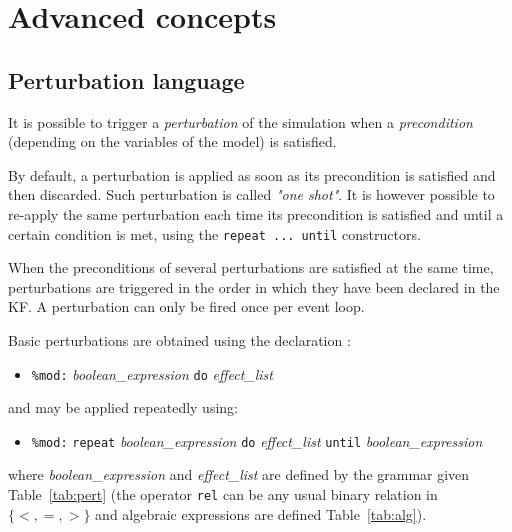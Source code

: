 \documentclass[11pt]{book}
\def\ttt#1{\texttt{#1}}
\def\set#1{\{#1\}}
\def\ITE#1{\begin{itemize}#1\end{itemize}}
\begin{document}
\chapter{Advanced concepts}\label{chap:advanced}

\section{Perturbation language}\label{sec:mod}

It is possible to trigger a \emph{perturbation} of
the simulation when a \textit{precondition} (depending on the
variables of the model) is satisfied.

By default, a perturbation is applied as soon as its precondition is
satisfied and then discarded. Such perturbation is called \emph{"one
  shot"}. It is however possible to
re-apply the same perturbation each time its precondition is
satisfied and until a certain condition is met, using the \ttt{repeat
  ... until} constructors.

When the preconditions of several perturbations are satisfied at the
same time, perturbations are triggered in the order in which they have
been declared in the KF. A perturbation can only be
fired once per event loop.

Basic perturbations are obtained using the declaration :
\ITE{
\item[] \ttt{\%mod:} \textit{boolean\_expression} \ttt{do} \textit{effect\_list}
}
and may be applied repeatedly using:
\ITE{
\item[] \ttt{\%mod:} \ttt{repeat} \textit{boolean\_expression} \ttt{do} \textit{effect\_list} \ttt{until} \textit{boolean\_expression}
}
where \textit{boolean\_expression} and \textit{effect\_list} are defined by the grammar given  Table~\ref{tab:pert} (the operator \ttt{rel} can be any usual binary relation in $\set{<,=,>}$ and algebraic expressions are defined Table~\ref{tab:alg}).
\end{document}
